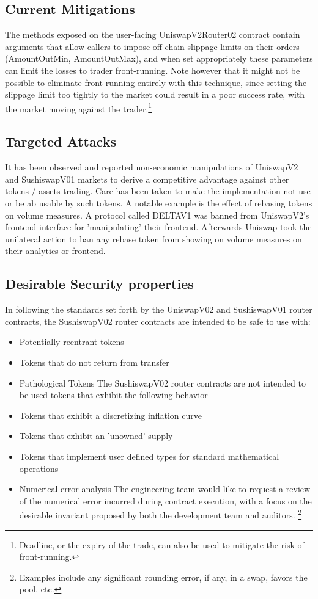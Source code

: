 \documentclass[runningheads]{llncs}
\begin{document}
\subsection{Current Mitigations}
The methods exposed on the user-facing UniswapV2Router02 contract contain arguments that allow callers to impose off-chain slippage limits on their orders (AmountOutMin, AmountOutMax), and when set appropriately these parameters can limit the losses to trader front-running. Note however that it might not be possible to eliminate front-running entirely with this technique, since setting the slippage limit too tightly to the market could result in a poor success rate, with the market moving against the trader.\footnote{Deadline, or the expiry of the trade, can also be used to mitigate the risk of front-running.}

\subsection{Targeted Attacks}
It has been observed and reported non-economic manipulations of UniswapV2 and SushiswapV01 markets to derive a competitive advantage against other tokens / assets trading. Care has been taken to make the implementation not use or be ab usable by such tokens. A notable example is the effect of rebasing tokens on volume measures. A protocol called DELTAV1\cite{Bacha 2022} was banned from UniswapV2's frontend interface for 'manipulating' their frontend. Afterwards Uniswap took the unilateral action to ban any rebase token from showing on volume measures on their analytics or frontend.

\subsection{Desirable Security properties}
In following the standards set forth by the UniswapV02 and SushiswapV01 router contracts, the SushiswapV02 router contracts are intended to be safe to use with:

\begin{itemize}
  \item Potentially reentrant tokens
  \item Tokens that do not return from transfer
  \item Pathological Tokens The SushiswapV02 router contracts are not intended to be used tokens that exhibit the following behavior
  \item Tokens that exhibit a discretizing inflation curve
  \item Tokens that exhibit an 'unowned' supply
  \item Tokens that implement user defined types for standard mathematical operations
  \item Numerical error analysis The engineering team would like to request a review of the numerical error incurred during contract execution, with a focus on the desirable invariant proposed by both the development team and auditors. \footnote{Examples include any significant rounding error, if any, in a swap, favors the pool. etc.}
\end{itemize}
\end{document}
